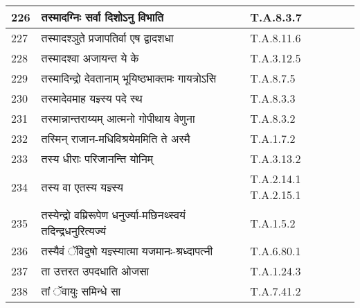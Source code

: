 \documentclass[17pt]{extarticle}
\begin{document}
\begin{longtable}{||p{0.4in}||p{4.9in}||p{0.9in}||}
    226 & तस्मादग्निः सर्वा दिशोऽनु विभाति & T.A.8.3.7       \\
    
    \hline
        
    227 & तस्मादश्ञुते प्रजापतिर्वा एष द्वादशधा & T.A.8.11.6       \\
    
    \hline
        
    228 & तस्मादश्वा अजायन्त ये के & T.A.3.12.5       \\
    
    \hline
        
    229 & तस्मादिन्द्रो देवतानाम् भूयिष्ठभाक्तमः गायत्रोऽसि & T.A.8.7.5       \\
    
    \hline
        
    230 & तस्मादेवमाह यज्ञ्स्य पदे स्थ & T.A.8.3.3       \\
    
    \hline
        
    231 & तस्मान्नान्तराय्यम् आत्मनो गोपीथाय वेणुना & T.A.8.3.2       \\
    
    \hline
        
    232 & तस्मिन् राजान{-}मधिविश्रयेममिति ते अस्मै & T.A.1.7.2       \\
    
    \hline
        
    233 & तस्य धीराः परिजानन्ति योनिम् & T.A.3.13.2       \\
    
    \hline
        
    234 & तस्य वा एतस्य यज्ञ्स्य & T.A.2.14.1 T.A.2.15.1       \\
    
    \hline
        
    235 & तस्येन्द्रो वम्रिरूपेण धनुर्ज्या{-}मछिनथ्स्वयं तदिन्द्रधनुरित्यज्यं & T.A.1.5.2       \\
    
    \hline
        
    236 & तस्यैवं ॅविदुषो यज्ञ्स्यात्मा यजमानः{-}श्रध्दापत्नी & T.A.6.80.1       \\
    
    \hline
        
    237 & ता उत्तरत उपदधाति ओजसा & T.A.1.24.3       \\
    
    \hline
        
    238 & तां ॅवायुः समिन्धे सा & T.A.7.41.2       \\
    

\end{longtable}
\end{document}
